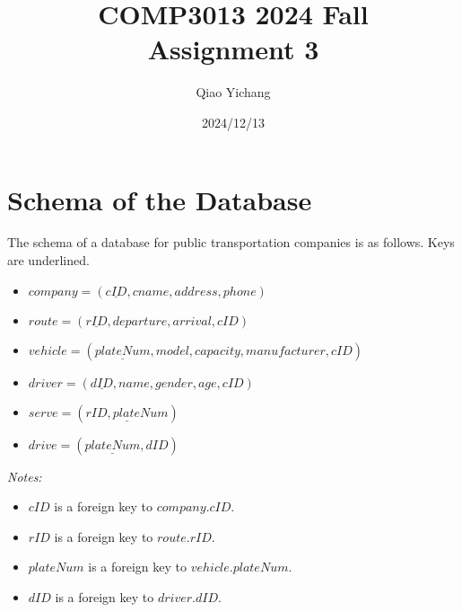 \documentclass[12pt]{article}
\title{COMP3013 2024 Fall\\Assignment 3}
\author{Qiao Yichang}
\date{2024/12/13}
\begin{document}
	\maketitle
	
	\section*{Schema of the Database}
	The schema of a database for public transportation companies is as follows. Keys are underlined.
	
	\begin{itemize}
		\item \(company = (\underline{cID}, cname, address, phone)\)
		\item \(route = (\underline{rID}, departure, arrival, cID)\)
		\item \(vehicle = (\underline{plateNum}, model, capacity, manufacturer, cID)\)
		\item \(driver = (\underline{dID}, name, gender, age, cID)\)
		\item \(serve = (\underline{rID, plateNum})\)
		\item \(drive = (\underline{plateNum}, dID)\)
	\end{itemize}
	
	\noindent \textit{Notes:}
	\begin{itemize}
		\item \(cID\) is a foreign key to \(company.cID\).
		\item \(rID\) is a foreign key to \(route.rID\).
		\item \(plateNum\) is a foreign key to \(vehicle.plateNum\).
		\item \(dID\) is a foreign key to \(driver.dID\).
	\end{itemize}
	
\end{document}
